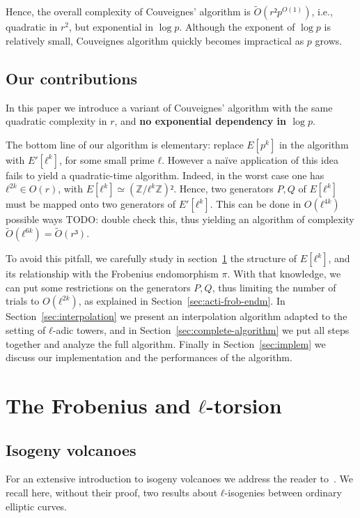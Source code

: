 \documentclass{lms}
\newcommand{\todo}[1]{{\color{red}TODO: #1}}
\newcommand{\tildO}{\tilde{O}}
\begin{document}
Hence, the overall complexity of Couveignes' algorithm is
$\tildO(r²p^{O(1)})$, i.e., quadratic in $r^2$, but exponential in
$\log p$. Although the exponent of $\log p$ is relatively small, Couveignes
algorithm quickly becomes impractical as $p$ grows.

\subsection{Our contributions}

In this paper we
introduce a variant of Couveignes' algorithm with the same quadratic
complexity in $r$, and \textbf{no exponential dependency in $\log p$}.

The bottom line of our algorithm is elementary: replace $E[p^k]$ in
the algorithm with $E'[ℓ^k]$, for some small prime $ℓ$. However a
naïve application of this idea fails to yield a quadratic-time
algorithm. Indeed, in the worst case one has $ℓ^{2k}∈O(r)$, with
$E[ℓ^k]≃(ℤ/ℓ^kℤ)²$. Hence, two generators $P,Q$ of $E[ℓ^k]$ must
be mapped onto two generators of $E'[ℓ^k]$. This can be done in
$O(ℓ^{4k})$ possible ways \todo{double check this}, thus yielding an
algorithm of complexity $\tildO(ℓ^{6k})=\tildO(r³)$.

To avoid this pitfall, we carefully study
in section~\ref{sec:isogeny-volcanoes} the structure of
$E[ℓ^k]$, and its relationship with the Frobenius endomorphism $π$.
With that knowledge, we can put some restrictions on the generators $P,Q$,
thus limiting the number of trials to $O(ℓ^{2k})$,
as explained in Section~\ref{sec:acti-frob-endm}.
In Section~\ref{sec:interpolation}
we present an interpolation algorithm adapted to the setting of
$ℓ$-adic towers, and in Section~\ref{sec:complete-algorithm} we put
all steps together and analyze the full algorithm. Finally in
Section~\ref{sec:implem} we discuss our implementation and the
performances of the algorithm.



\section{The Frobenius and $ℓ$-torsion}
\label{sec:isogeny-volcanoes}
\subsection{Isogeny volcanoes}

For an extensive introduction to isogeny volcanoes we address the
reader to~\cite{sutherland2013isogeny}.  We recall here, without their
proof, two results about $ℓ$-isogenies between ordinary elliptic
curves.
\end{document}
